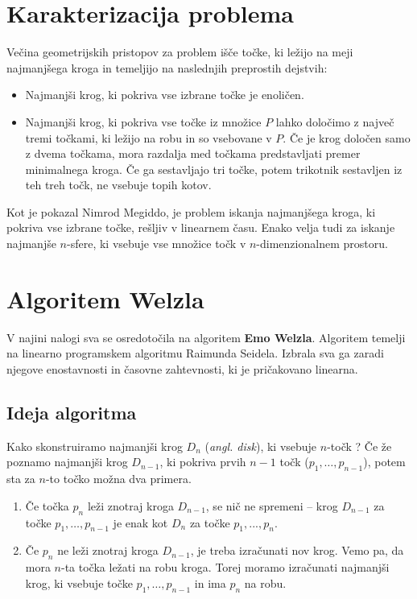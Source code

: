 \documentclass[a4paper]{article}
\begin{document}
\section{Karakterizacija problema}

Večina geometrijskih pristopov za problem išče točke, ki ležijo na meji
najmanjšega kroga in temeljijo na naslednjih preprostih dejstvih:
\begin{itemize}
\item Najmanjši krog, ki pokriva vse izbrane točke je enoličen.
\item Najmanjši krog, ki pokriva vse točke iz množice $P$ lahko določimo z
največ tremi točkami, ki ležijo na robu in so vsebovane v $P$. Če je
krog določen samo z dvema točkama, mora razdalja med točkama
predstavljati premer minimalnega kroga. Če ga sestavljajo tri
točke, potem trikotnik sestavljen iz teh treh točk, ne vsebuje
topih kotov.
\end{itemize}

Kot je pokazal Nimrod Megiddo, je problem iskanja najmanjšega kroga, ki
pokriva vse izbrane točke, rešljiv v linearnem času. Enako velja tudi za
iskanje najmanjše $n$-sfere, ki vsebuje vse množice točk v $n$-dimenzionalnem
prostoru.


\section{Algoritem Welzla}

V najini nalogi sva se osredotočila na algoritem \textbf{Emo Welzla}. Algoritem temelji na linearno programskem algoritmu Raimunda Seidela. Izbrala sva ga zaradi njegove enostavnosti in časovne zahtevnosti, ki je pričakovano linearna.

\subsection{Ideja algoritma}

Kako skonstruiramo najmanjši krog $D_n$  (\textit{angl. disk}), ki vsebuje $n$-točk ?
\newline Če že poznamo najmanjši krog $D_{n-1}$, ki pokriva  prvih $n-1$ točk ($p_1 ,…,p_{n-1}$), potem sta za $n$-to točko možna dva primera.

\begin{enumerate}
\item Če točka $p_n$ leži znotraj kroga $D_{n-1}$, se nič ne spremeni –  krog $D_{n-1}$ za točke $p_1 ,…,p_{n-1}$ je enak kot $D_n$ za točke $p_1,...,p_n$.
\item  Če $p_n$ ne leži znotraj kroga $D_{n-1}$, je treba izračunati nov krog. Vemo pa, da mora $n$-ta točka ležati na robu kroga. Torej moramo izračunati najmanjši krog, ki vsebuje točke $p_1 ,…,p_{n-1}$ in ima $p_n$ na robu.
\end{enumerate}
\end{document}
